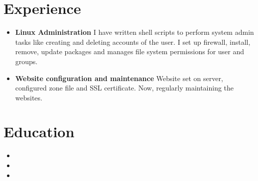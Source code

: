 \documentclass[10.1pt,a4paper,sans]{moderncv}        %
\begin{document}
\section{Experience}

\vspace{3pt}

\begin{itemize}


\item \textbf{Linux Administration}\newline
I have written shell scripts to perform system admin tasks like creating and deleting accounts of the user.
I set up firewall, install, remove, update packages and manages file system permissions for user and groups.

\vspace{3pt}

\item \textbf{Website configuration and maintenance}\newline
Website set on server, configured zone file and SSL certificate. Now, regularly maintaining the websites.

\end{itemize}

\section{Education}

\vspace{3pt}

\begin{itemize}

\item{}

\item{}  %

\item{}

\end{itemize}
\end{document}
